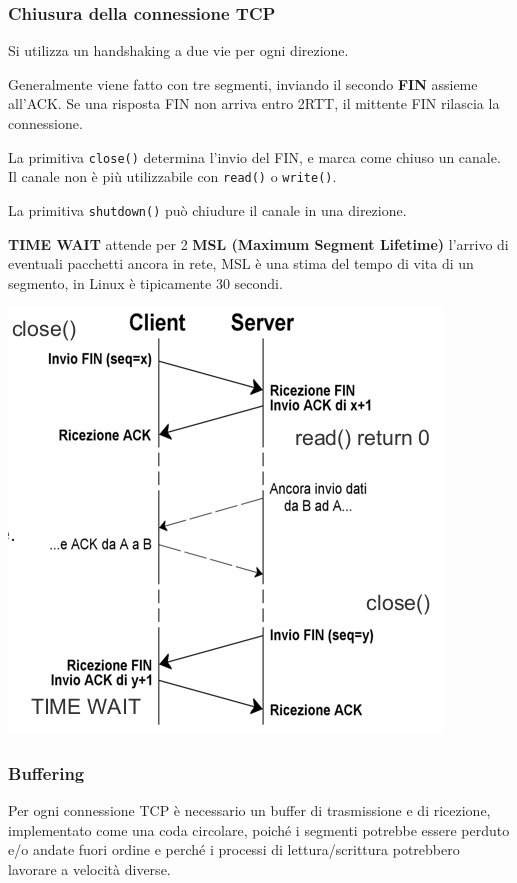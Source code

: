         \subsubsection{Chiusura della connessione TCP}
            Si utilizza un handshaking a due vie per ogni direzione.
        
            Generalmente viene fatto con tre segmenti, inviando il secondo \textbf{FIN} assieme all'ACK. Se una risposta FIN non arriva entro 2RTT, il mittente FIN rilascia la connessione.
        
            La primitiva \verb:close(): determina l'invio del FIN, e marca come chiuso un canale. Il canale non è più utilizzabile con \verb:read(): o \verb:write():.
        
            La primitiva \verb:shutdown(): può chiudure il canale in una direzione.
        
            \textbf{TIME WAIT} attende per 2 \textbf{MSL (Maximum Segment Lifetime)} l'arrivo di eventuali pacchetti ancora in rete, MSL è una stima del tempo di vita di un segmento, in Linux è tipicamente 30 secondi.

            \begin{center}
                \includegraphics[scale=0.5]{chapters/5/assets/schema_i.png}
            \end{center}

        \subsubsection{Buffering}
            Per ogni connessione TCP è necessario un buffer di trasmissione e di ricezione, implementato come una coda circolare, poiché i segmenti potrebbe essere perduto e/o andate fuori ordine e perché i processi di lettura/scrittura potrebbero lavorare a velocità diverse.
        
